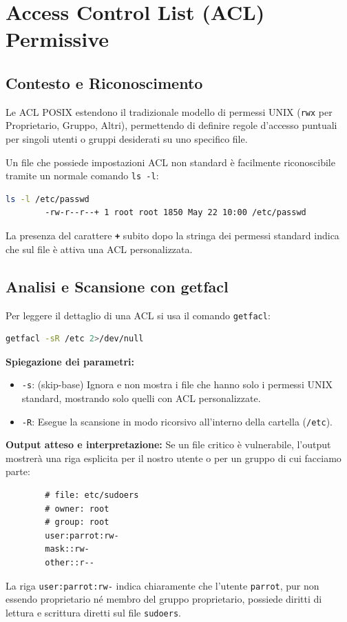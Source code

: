 \documentclass[12pt,a4paper]{report}
\begin{document}
	\section{Access Control List (ACL) Permissive}
	
	\subsection{Contesto e Riconoscimento}
	Le ACL POSIX estendono il tradizionale modello di permessi UNIX (\texttt{rwx} per Proprietario, Gruppo, Altri), permettendo di definire regole d'accesso puntuali per singoli utenti o gruppi desiderati su uno specifico file.
	
	Un file che possiede impostazioni ACL non standard è facilmente riconoscibile tramite un normale comando \texttt{ls -l}:
	\begin{lstlisting}[language=bash]
		ls -l /etc/passwd
		-rw-r--r--+ 1 root root 1850 May 22 10:00 /etc/passwd
	\end{lstlisting}
	La presenza del carattere \textbf{\texttt{+}} subito dopo la stringa dei permessi standard indica che sul file è attiva una ACL personalizzata.
	
	\subsection{Analisi e Scansione con getfacl}
	Per leggere il dettaglio di una ACL si usa il comando \texttt{getfacl}:
	\begin{lstlisting}[language=bash]
		getfacl -sR /etc 2>/dev/null
	\end{lstlisting}
	\textbf{Spiegazione dei parametri:}
	\begin{itemize}
		\item \texttt{-s}: (skip-base) Ignora e non mostra i file che hanno solo i permessi UNIX standard, mostrando solo quelli con ACL personalizzate.
		\item \texttt{-R}: Esegue la scansione in modo ricorsivo all'interno della cartella (\texttt{/etc}).
	\end{itemize}
	
	\textbf{Output atteso e interpretazione:}
	Se un file critico è vulnerabile, l'output mostrerà una riga esplicita per il nostro utente o per un gruppo di cui facciamo parte:
	\begin{lstlisting}
		# file: etc/sudoers
		# owner: root
		# group: root
		user:parrot:rw-
		mask::rw-
		other::r--
	\end{lstlisting}
	La riga \texttt{user:parrot:rw-} indica chiaramente che l'utente \texttt{parrot}, pur non essendo proprietario né membro del gruppo proprietario, possiede diritti di lettura e scrittura diretti sul file \texttt{sudoers}.
	
\end{document}
